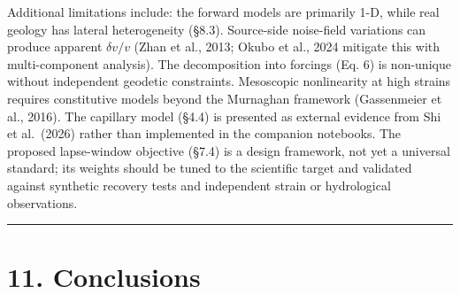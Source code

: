 \documentclass[12pt]{article}
\begin{document}
Additional limitations include: the forward models are primarily 1-D,
while real geology has lateral heterogeneity (§8.3). Source-side
noise-field variations can produce apparent \(\delta v/v\) (Zhan et al.,
2013; Okubo et al., 2024 mitigate this with multi-component analysis).
The decomposition into forcings (Eq. 6) is non-unique without
independent geodetic constraints. Mesoscopic nonlinearity at high
strains requires constitutive models beyond the Murnaghan framework
(Gassenmeier et al., 2016). The capillary model (§4.4) is presented as
external evidence from Shi et al.~(2026) rather than implemented in the
companion notebooks. The proposed lapse-window objective (§7.4) is a
design framework, not yet a universal standard; its weights should be
tuned to the scientific target and validated against synthetic recovery
tests and independent strain or hydrological observations.

\begin{center}\rule{0.5\linewidth}{0.5pt}\end{center}

\section{11. Conclusions}\label{conclusions}
\end{document}
